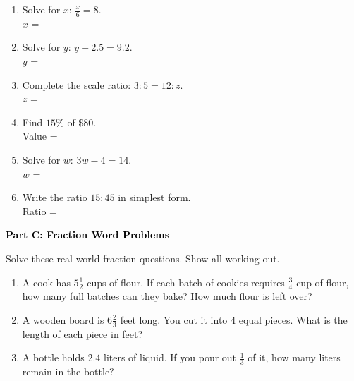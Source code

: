 \documentclass[12pt, letterpaper, fleqn]{article}
\newcommand{\blanklong}{\underline{\hspace{6.5cm}}}
\begin{document}
\begin{enumerate}[itemsep=2.0cm, leftmargin=0.6cm]
\item Solve for $x$: $\frac{x}{6} = 8$. \\
$x$ = \blanklong

\item Solve for $y$: $y + 2.5 = 9.2$. \\
$y$ = \blanklong

\item Complete the scale ratio: $3:5 = 12:z$. \\
$z$ = \blanklong

\item Find $15\%$ of $\$80$. \\
Value = \blanklong

\item Solve for $w$: $3w - 4 = 14$. \\
$w$ = \blanklong

\item Write the ratio $15:45$ in simplest form. \\
Ratio = \blanklong
\end{enumerate}

\newpage

\begin{tcolorbox}[colback=black!10]
    \large\textcolor{black}{\textbf{Part C: Fraction Word Problems}}
\end{tcolorbox}

\vspace{3mm}

\noindent
Solve these real-world fraction questions. Show all working out.

\vspace{5mm}

\begin{enumerate}[itemsep=2.5cm, leftmargin=0.6cm]
\item A cook has $5\frac{1}{2}$ cups of flour. If each batch of cookies requires $\frac{3}{4}$ cup of flour, how many full batches can they bake? How much flour is left over?
\vspace{1cm}

\item A wooden board is $6\frac{2}{3}$ feet long. You cut it into 4 equal pieces. What is the length of each piece in feet?
\vspace{1cm}

\item A bottle holds $2.4$ liters of liquid. If you pour out $\frac{1}{3}$ of it, how many liters remain in the bottle?
\end{enumerate}
\end{document}
